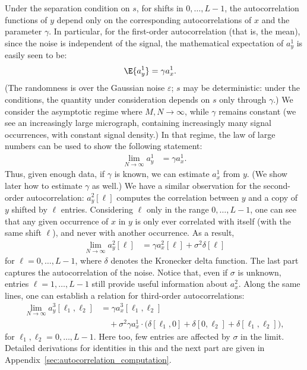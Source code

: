 \documentclass[9pt,twocolumn,twoside,lineno]{pnas-new}
\begin{document}
Under the separation condition on $s$,  for shifts in $0, \ldots, L-1$, the autocorrelation functions of $y$ depend only on the corresponding autocorrelations of $x$ and the parameter $\gamma$. In particular, for the first-order autocorrelation (that is, the mean), since the noise is independent of the signal, the mathematical expectation of $a_y^1$ is easily seen to be:
\begin{align*}
\E\{ a_y^1 \} & = \gamma a_x^1.
\end{align*}
(The randomness is over the Gaussian noise $\varepsilon$; $s$ may be deterministic: under the conditions, the quantity under consideration depends on $s$ only through $\gamma$.)
We consider the asymptotic regime where $M, N\to\infty$, while $\gamma$ remains constant (we see an increasingly large micrograph, containing increasingly many signal occurrences, with constant signal density.) In that regime, the law of large numbers can be used to show the following statement:
\begin{align} \label{eq:mean_micrograph}
\lim_{N\to\infty} a_y^1 & = \gamma a_{x}^1.
\end{align}
Thus, given enough data, if $\gamma$ is known, we can estimate $a_x^1$ from $y$. (We show later how to estimate $\gamma$ as well.) We have a similar observation for the second-order autocorrelation: $a_y^2[\ell]$ computes the correlation between $y$ and a copy of $y$ shifted by $\ell$ entries. Considering $\ell$ only in the range $0, \ldots, L-1$, one can see that any given occurrence of $x$ in $y$ is only ever correlated with itself (with the same shift $\ell$), and never with another occurrence. As a result,
\begin{align}
	\lim_{N\to\infty} a_y^2[\ell] & = \gamma a_{x}^2[\ell] + \sigma^2\delta[\ell]
	\label{eq:ac2_micrograph}
\end{align}
for $\ell = 0, \ldots, L-1$, where $\delta$ denotes the Kronecker delta function. The last part captures the autocorrelation of the noise. Notice that, even if $\sigma$ is unknown, entries $\ell = 1, \ldots, L-1$ still provide useful information about $a_x^2$.
Along the same lines, one can establish a relation for third-order autocorrelations:
\begin{align}
\lim_{N\to\infty} a_y^3[\ell_1,\ell_2] & = \gamma a_{x}^3[\ell_1,\ell_2] \label{eq:ac3_micrograph}\\ & \quad + \sigma^2\gamma a_{x}^1 \cdot \big(\delta[\ell_1,0]+\delta[0,\ell_2]+\delta[\ell_1,\ell_2]\big), 
 \nonumber
\end{align}
for $\ell_1,\ell_2 = 0, \ldots, L-1$. Here too, few entries are affected by $\sigma$ in the limit.
Detailed derivations for identities in this and the next part are given in Appendix~\ref{sec:autocorrelation_computation}.
\end{document}
